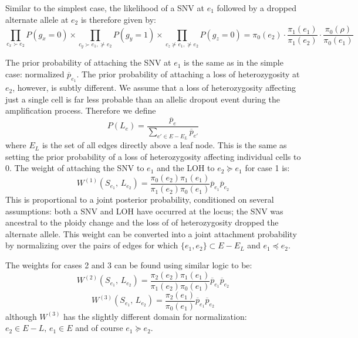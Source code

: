 \documentclass[../../main.tex]{subfiles}
\begin{document}
Similar to the simplest case, the likelihood of a SNV at $e_1$ followed by a dropped alternate allele at $e_2$ is therefore given by:
\begin{equation*}
    \prod\limits_{c_x\succ e_2}P(g_x = 0)\times\prod\limits_{c_y\succ e_1,\nsucc e_2} P(g_y = 1)\times\prod\limits_{c_z\nsucc e_1, \nsucc e_2} P(g_z=0)
    = \pi_0(e_2)\cdot\frac{\pi_1(e_1)}{\pi_1(e_2)}\cdot\frac{\pi_0(\rho)}{\pi_0(e_1)}
\end{equation*}

The prior probability of attaching the SNV at $e_1$ is the same as in the simple case: normalized $\overline{p}_{e_1}$.
The prior probability of attaching a loss of heterozygosity at $e_2$, however, is subtly different.
We assume that a loss of heterozygosity affecting just a single cell is far less probable than an allelic dropout event during the amplification process.
Therefore we define
\begin{equation*}
    P(L_{e}) = \frac{\overline{p}_e}{\sum_{e'\in E-E_L}\overline{p}_{e'}}
\end{equation*}
where $E_L$ is the set of all edges directly above a leaf node.
This is the same as setting the prior probability of a loss of heterozygosity affecting individual cells to 0.
The weight of attaching the SNV to $e_1$ and the LOH to $e_2\succeq e_1$ for case 1 is:
\begin{equation}
    W^{(1)}(S_{e_1},\,L_{e_2}) = \frac{\pi_0(e_2)\pi_1(e_1)}{\pi_1(e_2)\pi_0(e_1)}\overline{p}_{e_1}\overline{p}_{e_2}
\end{equation}
This is proportional to a joint posterior probability, conditioned on several assumptions: both a SNV and LOH have occurred at the locus; the SNV was ancestral to the ploidy change and the loss of of heterozygosity dropped the alternate allele.
This weight can be converted into a joint attachment probability by normalizing over the pairs of edges for which $\{e_1,e_2\}\subset E-E_L$ and $e_1\preceq e_2$.

The weights for cases 2 and 3 can be found using similar logic to be:
\begin{equation}
    W^{(2)}(S_{e_1},\,L_{e_2}) = \frac{\pi_2(e_2)\pi_1(e_1)}{\pi_1(e_2)\pi_0(e_1)}\overline{p}_{e_1}\overline{p}_{e_2}
\end{equation}
\begin{equation}
    W^{(3)}(S_{e_1},\,L_{e_2}) = \frac{\pi_2(e_1)}{\pi_0(e_1)}\overline{p}_{e_1}\overline{p}_{e_2}
\end{equation}
although $W^{(3)}$ has the slightly different domain for normalization: $e_2\in E-L,\,e_1\in E$ and of course $e_1\succeq e_2$.
\end{document}
